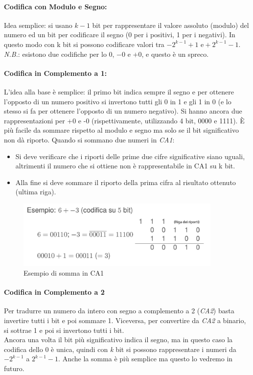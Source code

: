 \documentclass[class=book, crop=false]{standalone}
\begin{document}
\paragraph*{Codifica con Modulo e Segno:} Idea semplice: si usano $k-1$ bit per rappresentare il valore assoluto (modulo) del numero  ed un bit per codificare il segno (0 per i positivi, 1 per i negativi). In questo modo con k bit si possono codificare valori tra $-2^{k-1}+1 \text{ e} +2^{k-1}-1$.\\
\emph{N.B.}: esistono due codifiche per lo $0$, $-0$  e $+0$, e questo è un spreco.

\paragraph*{Codifica in Complemento a 1:} L’idea alla base è semplice: il primo bit indica sempre il segno e per ottenere l’opposto di un numero positivo si invertono tutti gli 0 in 1 e gli 1 in 0 (e lo stesso si fa per ottenere l’opposto di un numero negativo). Si hanno ancora due rappresentazioni per +0 e -0 (rispettivamente, utilizzando 4 bit, 0000 e 1111). È più facile da sommare rispetto al modulo e segno ma solo se il bit significativo non dà riporto.
Quando si sommano due numeri in \emph{CA1}:
\begin{itemize}[noitemsep]
	\item Si deve verificare che i riporti delle prime due cifre significative siano uguali, altrimenti il numero che si ottiene non è rappresentabile in CA1 su k bit.
	\item Alla fine si deve sommare il riporto della prima cifra al risultato ottenuto (ultima riga).
\end{itemize}

\begin{figure}[H]
	\centering
	\includegraphics[width=0.9\textwidth,keepaspectratio]{Somma-CA1.png}
	\caption{Esempio di somma in CA1}
\end{figure}

\paragraph*{Codifica in Complemento a 2} Per tradurre un numero da intero con segno a complemento a 2 (\emph{CA2}) basta invertire tutti i bit e poi sommare 1. Viceversa, per convertire da \emph{CA2} a binario, si sottrae 1 e poi si invertono tutti i bit. \\
Ancora una volta il bit più significativo indica il segno, ma in questo caso la codifica dello 0 è unica, quindi con \emph{k} bit si possono rappresentare i numeri da $-2^{k-1}$ a $2^{k-1}-1$. Anche la somma è più semplice ma questo lo vedremo in futuro.
\end{document}
